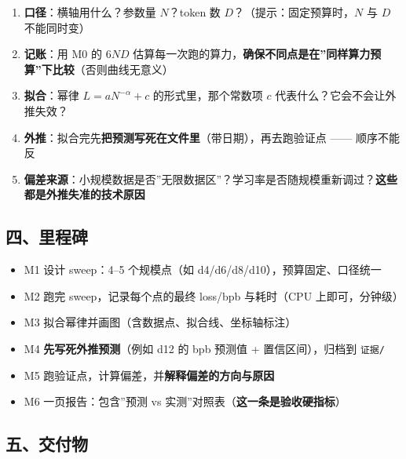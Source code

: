 \documentclass[
  chinese,
  11pt,
]{ctexart}
\providecommand{\tightlist}{%
  \setlength{\itemsep}{0pt}\setlength{\parskip}{0pt}}
\begin{document}
\begin{enumerate}
\def\labelenumi{\arabic{enumi}.}
\tightlist
\item
  \textbf{口径}：横轴用什么？参数量 \(N\)？token 数 \(D\)？（提示：固定预算时，\(N\) 与 \(D\) 不能同时变）
\item
  \textbf{记账}：用 M0 的 \(6ND\) 估算每一次跑的算力，\textbf{确保不同点是在''同样算力预算''下比较}（否则曲线无意义）
\item
  \textbf{拟合}：幂律 \(L = aN^{-\alpha} + c\) 的形式里，那个常数项 \(c\) 代表什么？它会不会让外推失效？
\item
  \textbf{外推}：拟合完先\textbf{把预测写死在文件里}（带日期），再去跑验证点 ------ 顺序不能反
\item
  \textbf{偏差来源}：小规模数据是否''无限数据区''？学习率是否随规模重新调过？\textbf{这些都是外推失准的技术原因}
\end{enumerate}

\subsection{四、里程碑}\label{ux56dbux91ccux7a0bux7891-1}

\begin{itemize}
\tightlist
\item[$\square$]
  M1 设计 sweep：4--5 个规模点（如 d4/d6/d8/d10），预算固定、口径统一
\item[$\square$]
  M2 跑完 sweep，记录每个点的最终 loss/bpb 与耗时（CPU 上即可，分钟级）
\item[$\square$]
  M3 拟合幂律并画图（含数据点、拟合线、坐标轴标注）
\item[$\square$]
  M4 \textbf{先写死外推预测}（例如 d12 的 bpb 预测值 + 置信区间），归档到 \texttt{证据/}
\item[$\square$]
  M5 跑验证点，计算偏差，并\textbf{解释偏差的方向与原因}
\item[$\square$]
  M6 一页报告：包含''预测 vs 实测''对照表（\textbf{这一条是验收硬指标}）
\end{itemize}

\subsection{五、交付物}\label{ux4e94ux4ea4ux4ed8ux7269-1}
\end{document}
